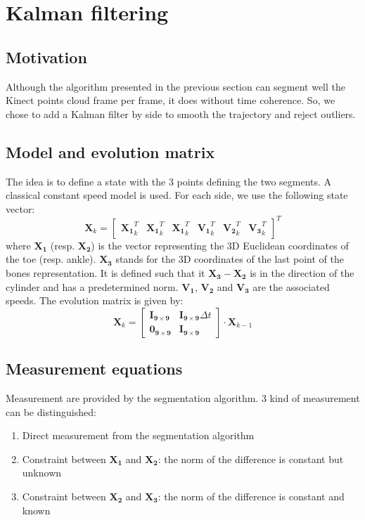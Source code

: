 \documentclass[letterpaper, 10 pt, conference]{ieeeconf}
\begin{document}
\section{Kalman filtering}
\label{sec:Kalman}

\subsection{Motivation}

Although the algorithm presented in the previous section can segment well the Kinect points cloud frame per frame, it does without time coherence. So, we chose to add a Kalman filter by side to smooth the trajectory and reject outliers. 

\subsection{Model and evolution matrix}
The idea is to define a state with the 3 points defining the two segments. A classical constant speed model is used. For each side, we use the following state vector:
\begin{equation}
	\mathbf{X}_k = 
	\begin{bmatrix}
		\mathbf{X_1}^T_k & \mathbf{X_1}^T_k & \mathbf{X_1}^T_k & \mathbf{V_1}^T_k & \mathbf{V_2}^T_k & \mathbf{V_3}^T_k
	\end{bmatrix}^T
\end{equation}
where $\mathbf{X_1}$ (resp. $\mathbf{X_2}$) is the vector representing the 3D Euclidean coordinates of the toe (resp. ankle). $\mathbf{X_3}$ stands for the 3D coordinates of the last point of the bones representation. It is defined such that it $\mathbf{X_3}-\mathbf{X_2}$ is in the direction of the cylinder and has a predetermined norm. $\mathbf{V_1}$, $\mathbf{V_2}$ and $\mathbf{V_3}$ are the associated speeds. The evolution matrix is given by:
\begin{equation}
	\mathbf{X}_{k} =
	\begin{bmatrix}
		\mathbf{I_{9\times 9}} & \mathbf{I_{9\times 9}}\Delta t  \\
		\mathbf{0_{9\times 9}} & \mathbf{I_{9\times 9}}
	\end{bmatrix}\cdot \mathbf{X}_{k-1}
\end{equation}

\subsection{Measurement equations}
Measurement are provided by the segmentation algorithm. 3 kind of measurement can be distinguished:
\begin{enumerate}
	\item Direct measurement from the segmentation algorithm
	\item Constraint between $\mathbf{X_1}$ and $\mathbf{X_2}$: the norm of the difference is constant but unknown
	\item Constraint between $\mathbf{X_2}$ and $\mathbf{X_3}$: the norm of the difference is constant and known
\end{enumerate}
\end{document}
